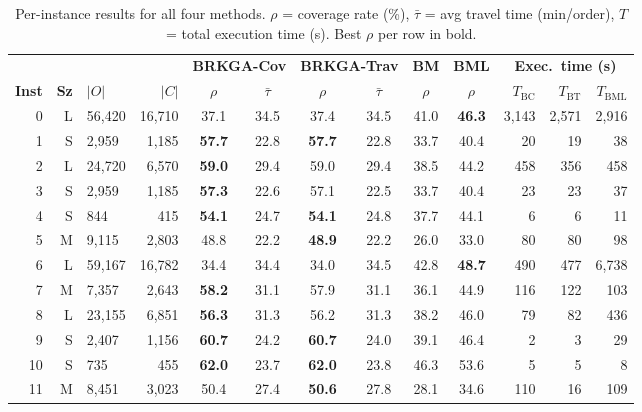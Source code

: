\documentclass[runningheads]{llncs}
\begin{document}
\begin{table}[ht]
\centering
\caption{Per-instance results for all four methods.
$\rho$ = coverage rate (\%), $\bar{\tau}$ = avg travel time (min/order),
$T$ = total execution time (s). Best $\rho$ per row in bold.}
\label{tab:results_all}
\scriptsize
\setlength{\tabcolsep}{2.8pt}
\begin{tabular}{rrlr|cc|cc|c|c|rrr}
\hline
 & & & &
\multicolumn{2}{c|}{\textbf{BRKGA-Cov}} &
\multicolumn{2}{c|}{\textbf{BRKGA-Trav}} &
\textbf{BM} &
\textbf{BML} &
\multicolumn{3}{c}{\textbf{Exec.\ time (s)}} \\
\textbf{Inst} & \textbf{Sz} & $|O|$ & $|C|$ &
$\rho$ & $\bar{\tau}$ & $\rho$ & $\bar{\tau}$ &
$\rho$ & $\rho$ &
$T_{\text{BC}}$ & $T_{\text{BT}}$ & $T_{\text{BML}}$ \\
\hline
0  & L & 56{,}420 & 16{,}710 & 37.1 & 34.5 & 37.4 & 34.5 & 41.0 & \textbf{46.3} & 3{,}143 &    2{,}571 & 2{,}916 \\
1  & S &  2{,}959 &  1{,}185 & \textbf{57.7} & 22.8 & \textbf{57.7} & 22.8 & 33.7 & 40.4 &      20 &     19 &    38 \\
2  & L & 24{,}720 &  6{,}570 & \textbf{59.0} & 29.4 & 59.0 & 29.4 & 38.5 & 44.2 &     458 &    356 &   458 \\
3  & S &  2{,}959 &  1{,}185 & \textbf{57.3} & 22.6 & 57.1 & 22.5 & 33.7 & 40.4 &      23 &     23 &    37 \\
4  & S &    844   &    415   & \textbf{54.1} & 24.7 & \textbf{54.1} & 24.8 & 37.7 & 44.1 &       6 &      6 &    11 \\
5  & M &  9{,}115 &  2{,}803 & 48.8 & 22.2 & \textbf{48.9} & 22.2 & 26.0 & 33.0 &      80 &     80 &    98 \\
6  & L & 59{,}167 & 16{,}782 & 34.4 & 34.4 & 34.0 & 34.5 & 42.8 & \textbf{48.7} &     490 &    477 & 6{,}738 \\
7  & M &  7{,}357 &  2{,}643 & \textbf{58.2} & 31.1 & 57.9 & 31.1 & 36.1 & 44.9 &     116 &     122 &   103 \\
8  & L & 23{,}155 &  6{,}851 & \textbf{56.3} & 31.3 & 56.2 & 31.3 & 38.2 & 46.0 &      79 &     82 &   436 \\
9  & S &  2{,}407 &  1{,}156 & \textbf{60.7} & 24.2 & \textbf{60.7} & 24.0 & 39.1 & 46.4 &       2 &      3 &    29 \\
10 & S &    735   &    455   & \textbf{62.0} & 23.7 & \textbf{62.0} & 23.8 & 46.3 & 53.6 &       5 &      5 &     8 \\
11 & M &  8{,}451 &  3{,}023 & 50.4 & 27.4 & \textbf{50.6} & 27.8 & 28.1 & 34.6 &     110 &     16 &   109 \\

\end{tabular}
\end{table}
\end{document}
